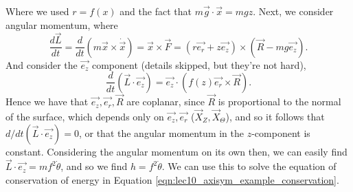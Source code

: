 Where we used $r=f(x)$ and the fact that $m\vec{g}\cdot\vec{x}=mgz$. Next, we
consider angular momentum, where 
\[\frac{d\vec{L}}{dt} = \frac{d}{dt}(m\vec{x}\times\dot{\vec{x}}) =
\vec{x}\times\vec{F} = (r\vec{e_r} + z\vec{e_z})\times (\vec{R} - mg\vec{e_z}).\]
And consider the $\vec{e_z}$ component (details skipped, but they're not hard),
\[\frac{d}{dt}(\vec{L}\cdot
\vec{e_z})=\vec{e_z}\cdot(f(z)\vec{e_r}\times\vec{R}).\]
Hence we have that $\vec{e_z},\vec{e_r},\vec{R}$ are coplanar, since $\vec{R}$
is proportional to the normal of the surface, which depends only on
$\vec{e_z},\vec{e_r}$ ($\vec{X}_Z, \vec{X}_{\Theta}$), and so it follows that
$d/dt (\vec{L}\cdot \vec{e_z})=0$, or that the angular momentum in the
$z$-component is constant. Considering the angular momentum on its own then, we
can easily find $\vec{L}\cdot\vec{e_z}=mf^2\dot{\theta}$, and so we find
$h=f^2\dot{\theta}$. We can use this to solve the equation of conservation of
energy in Equation \ref{eqn:lec10_axisym_example_conservation}.
